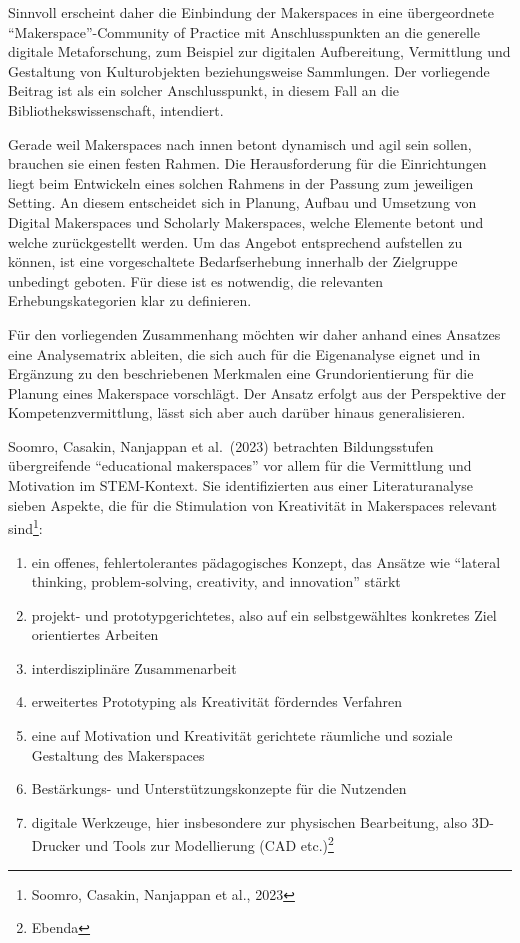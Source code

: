 \documentclass[a4paper,
fontsize=11pt,
oneside,
numbers=noperiodatend,
parskip=half-,
bibliography=totoc,
final
]{scrartcl}
\begin{document}
Sinnvoll erscheint daher die Einbindung der Makerspaces in eine
übergeordnete \enquote{Makerspace}-Community of Practice mit
Anschlusspunkten an die generelle digitale Metaforschung, zum Beispiel
zur digitalen Aufbereitung, Vermittlung und Gestaltung von
Kulturobjekten beziehungsweise Sammlungen. Der vorliegende Beitrag ist
als ein solcher Anschlusspunkt, in diesem Fall an die
Bibliothekswissenschaft, intendiert.

Gerade weil Makerspaces nach innen betont dynamisch und agil sein
sollen, brauchen sie einen festen Rahmen. Die Herausforderung für die
Einrichtungen liegt beim Entwickeln eines solchen Rahmens in der Passung
zum jeweiligen Setting. An diesem entscheidet sich in Planung, Aufbau
und Umsetzung von Digital Makerspaces und Scholarly Makerspaces, welche
Elemente betont und welche zurückgestellt werden. Um das Angebot
entsprechend aufstellen zu können, ist eine vorgeschaltete
Bedarfserhebung innerhalb der Zielgruppe unbedingt geboten. Für diese
ist es notwendig, die relevanten Erhebungskategorien klar zu definieren.

Für den vorliegenden Zusammenhang möchten wir daher anhand eines
Ansatzes eine Analysematrix ableiten, die sich auch für die Eigenanalyse
eignet und in Ergänzung zu den beschriebenen Merkmalen eine
Grundorientierung für die Planung eines Makerspace vorschlägt. Der
Ansatz erfolgt aus der Perspektive der Kompetenzvermittlung, lässt sich
aber auch darüber hinaus generalisieren.

Soomro, Casakin, Nanjappan et al.~(2023) betrachten Bildungsstufen
übergreifende \enquote{educational makerspaces} vor allem für die
Vermittlung und Motivation im STEM-Kontext. Sie identifizierten aus
einer Literaturanalyse sieben Aspekte, die für die Stimulation von
Kreativität in Makerspaces relevant sind\footnote{Soomro, Casakin,
  Nanjappan et al., 2023}:

\begin{enumerate}
\def\labelenumi{\arabic{enumi}.}
\item
  ein offenes, fehlertolerantes pädagogisches Konzept, das Ansätze wie
  \enquote{lateral thinking, problem-solving, creativity, and
  innovation} stärkt
\item
  projekt- und prototypgerichtetes, also auf ein selbstgewähltes
  konkretes Ziel orientiertes Arbeiten
\item
  interdisziplinäre Zusammenarbeit
\item
  erweitertes Prototyping als Kreativität förderndes Verfahren
\item
  eine auf Motivation und Kreativität gerichtete räumliche und soziale
  Gestaltung des Makerspaces
\item
  Bestärkungs- und Unterstützungskonzepte für die Nutzenden
\item
  digitale Werkzeuge, hier insbesondere zur physischen Bearbeitung, also
  3D-Drucker und Tools zur Modellierung (CAD etc.)\footnote{Ebenda}
\end{enumerate}
\end{document}
